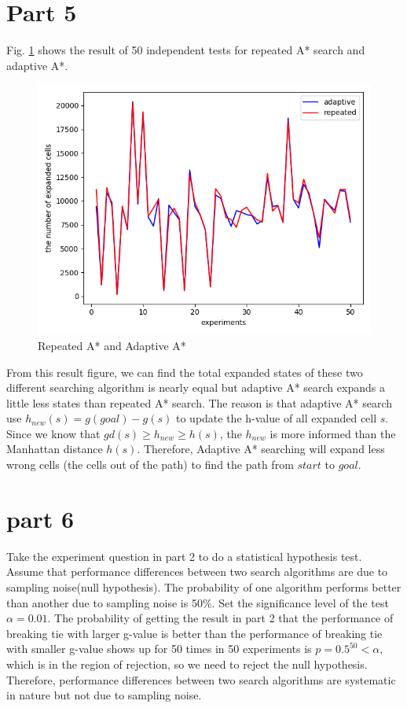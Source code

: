 \documentclass[11pt]{article}
\begin{document}
\section*{Part 5}
Fig. \ref{fig:Fig5.ada} shows the result of 50 independent tests for repeated A* search and adaptive A*.
\begin{figure}[htb]
	\centering
	\includegraphics[scale = 0.3]{repeated_adaptive.png}
	\caption{Repeated A* and Adaptive A*}
	\label{fig:Fig5.ada}
\end{figure}
\newline
From this result figure, we can find the total expanded states of these two different searching algorithm is nearly equal but adaptive A* search expands a little less states than repeated A* search. The reason is that adaptive A* search use $h_{new}(s) = g(goal) - g(s)$ to update the h-value of all expanded cell $s$. Since we know that $gd(s)\geq h_{new}\geq h(s)$, the $h_{new}$ is more informed than the Manhattan distance $h(s)$. Therefore, Adaptive A* searching will expand less wrong cells (the cells out of the path) to find the path from $start$ to $goal$. 

\section*{part 6}
Take the experiment question in part 2 to do a statistical hypothesis test.
\newline
Assume that performance differences between two search algorithms  are  due to sampling noise(null hypothesis). The probability of one algorithm performs better than another due to sampling noise is 50\%. Set the significance level of the test $\alpha=0.01$. The probability of getting the result in part 2 that the performance of breaking tie with larger g-value is better than the performance of breaking tie with smaller g-value shows up for 50 times in 50 experiments is $p=0.5^{50}<\alpha$, which is in the region of rejection, so we need to reject the null hypothesis. Therefore, performance differences between two search algorithms are systematic in nature but not due to sampling noise.
\end{document}
